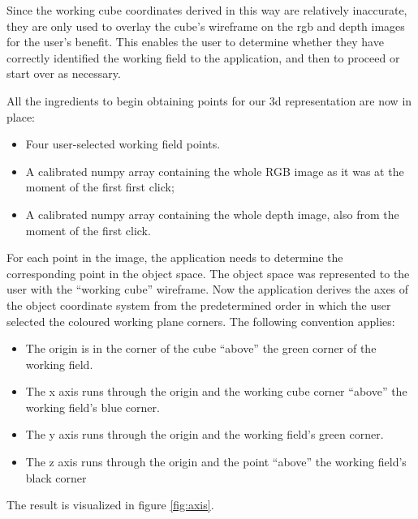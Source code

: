 Since the working cube coordinates derived in this way are relatively
inaccurate, they are only used to overlay the cube's wireframe on the rgb and
depth images for the user's benefit. This enables the user to determine whether
they have correctly identified the working field to the application, and then to
proceed or start over as necessary.

All the ingredients to begin obtaining points for our 3d representation are now
in place:
\begin{itemize}

\item Four user-selected working field points.

\item A calibrated numpy array containing the whole RGB image as it was at the
moment of the first first click;

\item A calibrated numpy array containing the whole depth image, also from the
moment of the first click.

\end{itemize}

For each point in the image, the application needs to determine the
corresponding point in the object space. The object space was represented to the
user with the ``working cube'' wireframe. Now the application derives the axes
of the object coordinate system from the predetermined order in which the user
selected the coloured working plane corners. The following convention applies:
\begin{itemize}

\item The origin is in the corner of the cube ``above'' the green corner of the
working field.

\item The x axis runs through the origin and the working cube corner ``above'' the
working field's blue corner.

\item The y axis runs through the origin and the working field's green corner.

\item The z axis runs through the origin and the point ``above'' the working
field's black corner

\end{itemize}

The result is visualized in figure \ref{fig:axis}. \\

